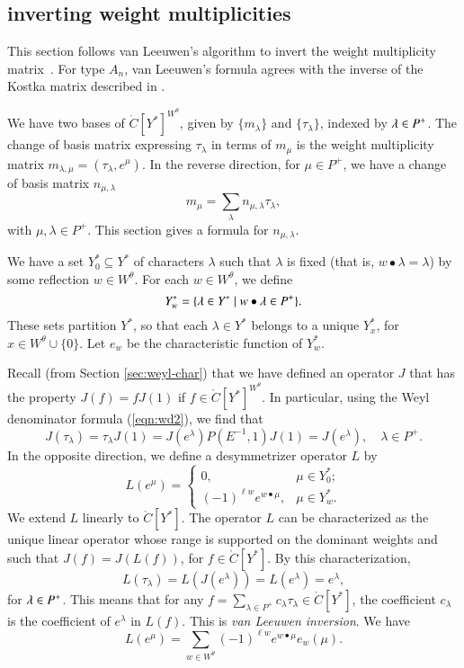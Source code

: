 \subsection{inverting weight multiplicities}

This section follows van Leeuwen's algorithm to invert the weight
multiplicity matrix~\cite{vanleeuwen}.  For type $A_n$, van Leeuwen's
formula agrees with the inverse of the Kostka matrix described in
\cite{duan}.

We have two bases of $\ring{C}[Y^*]^{W^\theta}$, given by
$\{m_\lambda\}$ and $\{\tau_\lambda\}$, indexed by $\lambda\in P^+$.
The change of basis matrix expressing $\tau_\lambda$ in terms of
$m_\mu$ is the weight multiplicity matrix $m_{\lambda,\mu} =
(\tau_\lambda,e^\mu)$.  In the reverse direction, for $\mu\in P^+$, we
have a change of basis matrix $n_{\mu,\lambda}$
\begin{equation}\label{eqn:n}
m_\mu = \sum_{\lambda} n_{\mu,\lambda} \tau_\lambda,
\end{equation}
with $\mu,\lambda\in P^+$.
This section gives a formula for $n_{\mu,\lambda}$.  

We have a set $Y^*_0\subseteq Y^*$ of characters $\lambda$ such that
$\lambda$ is fixed (that is, $w\bullet \lambda = \lambda$) by some
reflection $w\in W^\theta$.  For each $w\in W^\theta$, we define
\begin{equation}
Y^*_w = \{\lambda\in Y^*\mid w\bullet \lambda \in P^+\}.
\end{equation}
These sets partition $Y^*$, so that each $\lambda\in Y^*$ belongs to a
unique $Y^*_x$, for $x\in W^\theta\cup\{0\}$.  Let $e_w$ be the
characteristic function of $Y^*_w$.

Recall (from Section \ref{sec:weyl-char}) that we have defined an
operator $J$ that has the property $J(f) = f J(1)$ if $f\in
\ring{C}[Y^*]^{W^\theta}$.  In particular, using the Weyl denominator
formula (\ref{eqn:wd2}), we find that
\begin{equation}
 J(\tau_\lambda) = \tau_\lambda J(1) 
= J(e^\lambda) P(E^{-1},1) J(1) = J(e^\lambda),\quad  \lambda\in P^+.
\end{equation}
In the opposite direction, we define a desymmetrizer operator $L$ by
\[
L(e^\mu) = \begin{cases}
0,& \mu\in Y^*_0;\\
(-1)^{\ell{w}} e^{w\bullet \mu},& \mu\in Y^*_w.
\end{cases}
\]
We extend $L$ linearly to $\ring{C}[Y^*]$.  The operator $L$ can be
characterized as the unique linear operator whose range is supported
on the dominant weights and such that $J(f) = J(L(f))$, for $f\in
\ring{C}[Y^*]$.  By this characterization, 
\[
L(\tau_\lambda) = L(J(e^\lambda)) = L(e^\lambda) =
e^\lambda, 
\]  
for $\lambda\in P^+$.
This means that for any $f =
\sum_{\lambda\in P^+} c_\lambda \tau_\lambda \in \ring{C}[Y^*]$, the
coefficient $c_\lambda$ is the coefficient of $e^\lambda$ in $L(f)$.
This is {\it van Leeuwen inversion}.
We have
\[
L(e^\mu) = \sum_{w\in W^\theta} (-1)^{\ell w} e^{w\bullet \mu} e_w(\mu).
\]

